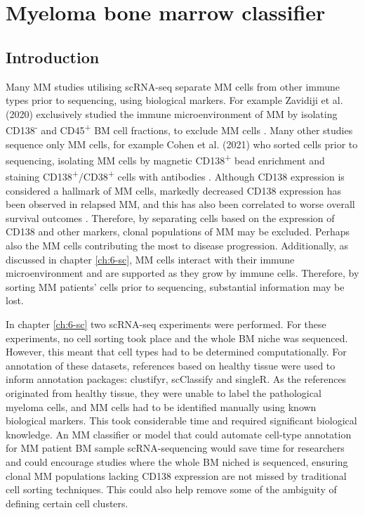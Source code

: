 \section{Myeloma bone marrow classifier}\label{sec:MM_classifier}
\subsection{Introduction}

Many MM studies utilising scRNA-seq separate MM cells from other immune types prior to sequencing, using biological markers.
For example Zavidiji et al. (2020) exclusively studied the immune microenvironment of MM by isolating CD138\textsuperscript{-} and CD45\textsuperscript{+} BM cell fractions, to exclude MM cells \cite{zavidij2020single}.
Many other studies sequence only MM cells, for example Cohen et al. (2021) who sorted cells prior to sequencing, isolating MM cells by magnetic CD138\textsuperscript{+} bead enrichment and staining CD138\textsuperscript{+}/CD38\textsuperscript{+} cells with antibodies \cite{cohen2021identification}.
Although CD138 expression is considered a hallmark of MM cells, markedly decreased CD138 expression has been observed in relapsed MM, and this has also been correlated to worse overall survival outcomes \cite{kawano2012multiple}.
Therefore, by separating cells based on the expression of CD138 and other markers, clonal populations of MM may be excluded.
Perhaps also the MM cells contributing the most to disease progression.
Additionally, as discussed in chapter \ref{ch:6-sc}, MM cells interact with their immune microenvironment and are supported as they grow by immune cells.
Therefore, by sorting MM patients' cells prior to sequencing, substantial information may be lost.

In chapter \ref{ch:6-sc} two scRNA-seq experiments were performed.
For these experiments, no cell sorting took place and the whole BM niche was sequenced.
However, this meant that cell types had to be determined computationally.
For annotation of these datasets, references based on healthy tissue were used to inform annotation packages: clustifyr, scClassify and singleR.
As the references originated from healthy tissue, they were unable to label the pathological myeloma cells, and MM cells had to be identified manually using known biological markers.
This took considerable time and required significant biological knowledge.
An MM classifier or model that could automate cell-type annotation for MM patient BM sample scRNA-sequencing would save time for researchers and could encourage studies where the whole BM niched is sequenced, ensuring clonal MM populations lacking CD138 expression are not missed by traditional cell sorting techniques.
This could also help remove some of the ambiguity of defining certain cell clusters.

